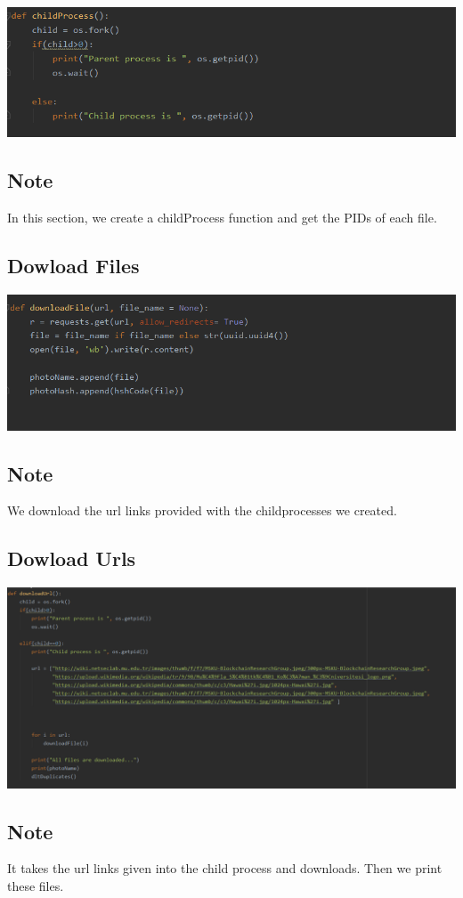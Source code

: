 \documentclass[onecolumn]{article}
\begin{document}
\includegraphics[scale =0.80]{child.PNG}
\subsection*{Note} %
In this section, we create a childProcess function and get the PIDs of each file.

\subsection{Dowload Files}
\includegraphics[scale = 0.80]{dowload.PNG}
\subsection*{Note} %
We download the url links provided with the childprocesses we created.
\subsection{Dowload Urls}
\includegraphics[scale =0.60]{last.PNG}
\subsection*{Note} %
It takes the url links given into the child process and downloads. Then we print these files.
\end{document}
